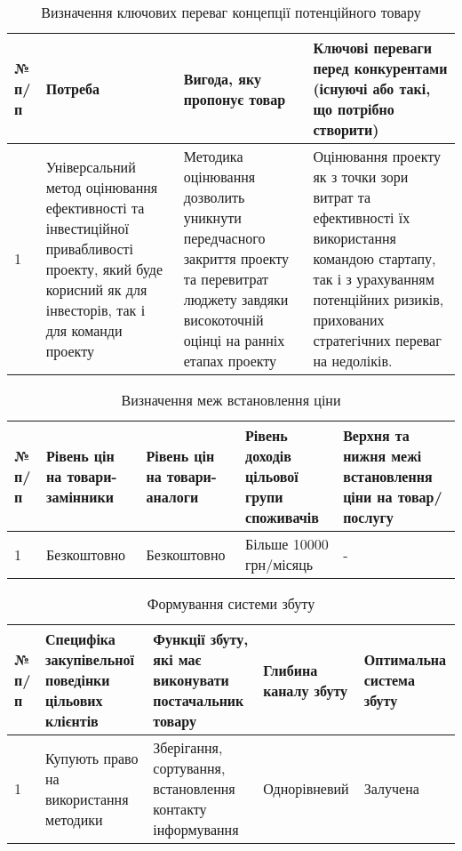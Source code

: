 \begin{table}[h!]
	\begin{tabularx}{\textwidth}{|l|X|X|X|}
    \hline
    № п/п & Потреба & Вигода, яку пропонує товар & Ключові переваги перед конкурентами (існуючі або такі, що потрібно створити) \\ \hline
    1 & Універсальний метод оцінювання ефективності та інвестиційної привабливості проекту, який буде корисний як для інвесторів, так і для команди проекту & Методика оцінювання дозволить уникнути передчасного закриття проекту та перевитрат люджету завдяки високоточній оцінці на ранніх етапах проекту & Оцінювання проекту як з точки зори витрат та ефективності їх використання командою стартапу, так і з урахуванням потенційних ризиків, прихованих стратегічних переваг на недоліків. \\
    \hline
    \end{tabularx}
\caption{Визначення ключових переваг концепції потенційного товару} \label{tab:stab_13}
\end{table}

\begin{table}[h!]
	\begin{tabularx}{\textwidth}{|l|X|X|X|X|}
    \hline
    № п/п & Рівень цін на товари-замінники & Рівень цін на товари-аналоги & Рівень доходів цільової групи споживачів & Верхня та нижня межі встановлення ціни на товар/послугу \\ \hline
    1 & Безкоштовно & Безкоштовно & Більше 10000 грн/місяць & - \\
    \hline
    \end{tabularx}
\caption{Визначення меж встановлення ціни} \label{tab:stab_14}
\end{table}

\begin{table}[h!]
\fontsize{12pt}{12pt}\selectfont
	\begin{tabularx}{\textwidth}{|l|X|X|X|X|}
    \hline
    № п/п & Специфіка закупівельної поведінки цільових клієнтів & Функції збуту, які має виконувати постачальник товару & Глибина каналу збуту & Оптимальна система збуту \\ \hline
    1 & Купують право на використання методики & Зберігання, сортування, встановлення контакту інформування & Однорівневий & Залучена \\
    \hline
    \end{tabularx}
\caption{Формування системи збуту} \label{tab:stab_15}
\end{table}

